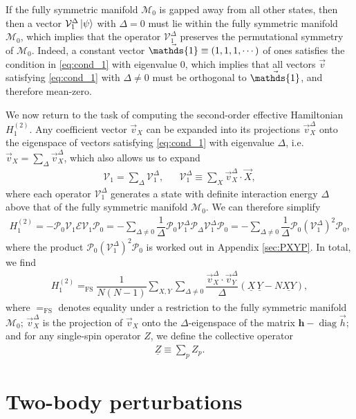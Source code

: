 \documentclass[nofootinbib,notitlepage,11pt]{revtex4-2}
\newcommand{\f}[2]{\dfrac{#1}{#2}} %
\newcommand{\p}[1]{\left(#1\right)} %
\renewcommand{\c}{\cdot} %
\newcommand{\m}{\bm} %
\renewcommand{\v}{\vec} %
\newcommand{\1}{\mathds{1}}
\newcommand{\E}{\mathcal{E}}
\newcommand{\M}{\mathcal{M}}
\renewcommand{\P}{\mathcal{P}}
\newcommand{\V}{\mathcal{V}}
\newcommand{\EQFS}{=_{\text{FS}}}
\newcommand{\col}{\underline}
\DeclareMathOperator{\diag}{diag}
\begin{document}
If the fully symmetric manifold $\M_0$ is gapped away from all other
states, then then a vector $\V_1^\Delta\ket\psi$ with $\Delta=0$ must
lie within the fully symmetric manifold $\M_0$, which implies that the
operator $\V_1^\Delta$ preserves the permutational symmetry of $\M_0$.
Indeed, a constant vector $\v\1\equiv\p{1,1,1,\cdots}$ of ones
satisfies the condition in \eqref{eq:cond_1} with eigenvalue $0$,
which implies that all vectors $\v v$ satisfying \eqref{eq:cond_1}
with $\Delta\ne0$ must be orthogonal to $\v\1$, and therefore
mean-zero.

We now return to the task of computing the second-order effective
Hamiltonian $H_1^{(2)}$.  Any coefficient vector $\v v_X$ can be
expanded into its projections $\v v_X^\Delta$ onto the eigenspace of
vectors satisfying \eqref{eq:cond_1} with eigenvalue $\Delta$,
i.e.~$\v v_X = \sum_\Delta \v v_X^\Delta$, which also allows us to
expand
\begin{align}
  \V_1 = \sum_\Delta \V_1^\Delta,
  &&
  \V_1^\Delta \equiv \sum_X \v v_X^\Delta \c \v X,
\end{align}
where each operator $\V_1^\Delta$ generates a state with definite
interaction energy $\Delta$ above that of the fully symmetric manifold
$\M_0$.  We can therefore simplify
\begin{align}
  H_1^{(2)}
  = - \P_0 \V_1 \E \V_1 \P_0
  = - \sum_{\Delta\ne0} \f1{\Delta}
  \P_0 \V_1^\Delta \P_\Delta \V_1^\Delta \P_0
  = - \sum_{\Delta\ne0} \f1{\Delta} \P_0 \p{\V_1^\Delta}^2 \P_0,
\end{align}
where the product $\P_0 \p{\V_1^\Delta}^2 \P_0$ is worked out in
Appendix \ref{sec:PXYP}.  In total, we find
\begin{align}
  H_1^{(2)}
  \EQFS \f1{N\p{N-1}} \sum_{X,Y} \sum_{\Delta\ne0}
  \f{\v v_X^\Delta\c\v v_Y^\Delta}{\Delta}
  \p{\col{X}\,\col{Y} - N \col{XY}},
  \label{eq:H_1_2}
\end{align}
where $\EQFS$ denotes equality under a restriction to the fully
symmetric manifold $\M_0$; $\v v_X^\Delta$ is the projection of
$\v v_X$ onto the $\Delta$-eigenspace of the matrix $\m h-\diag\v h$;
and for any single-spin operator $Z$, we define the collective
operator
\begin{align}
  \col{Z} \equiv \sum_p Z_p.
\end{align}

\section{Two-body perturbations}
\label{sec:two_body_pert}
\end{document}

